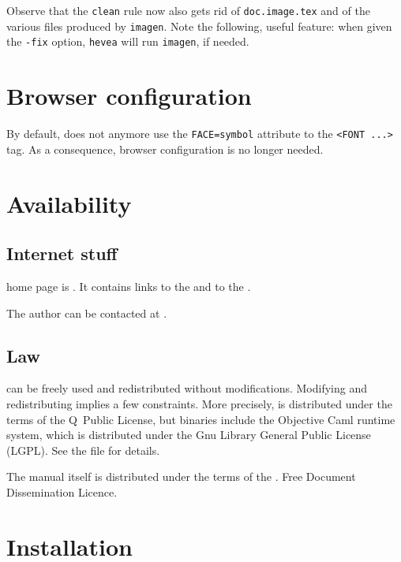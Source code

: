 Observe that the \texttt{clean} rule now also gets rid of
\texttt{doc.image.tex} and of the various files produced by
\texttt{imagen}. Note the following, useful feature:
when given the \verb+-fix+ option, \texttt{hevea} will run
\texttt{imagen}, if needed.


\section{Browser \label{browser}configuration}
By default, \hevea{} does not anymore use the \verb+FACE=symbol+
attribute to the \verb+<FONT ...>+ tag.  As a consequence, browser
configuration is no longer needed.


\section{Availability}

\subsection{Internet stuff}

\hevea{} home page is \ahrefurl{\httpbase}. It contains links to the
and to the .

The author can be contacted at .

\subsection{Law}
\hevea{} can be freely used and redistributed without modifications.
Modifying and redistributing \hevea{} implies a few constraints.
More precisely, \hevea{} is distributed under the terms of the
Q~Public License, but \hevea{} binaries include the Objective Caml
runtime system, which is distributed under the Gnu Library General
Public License (LGPL).
See the  file for details.

The manual itself is distributed under the terms of
the
\ifhevea
{}.
\else
{}
{Free Document Dissemination Licence}.
\fi

\section{Installation}

